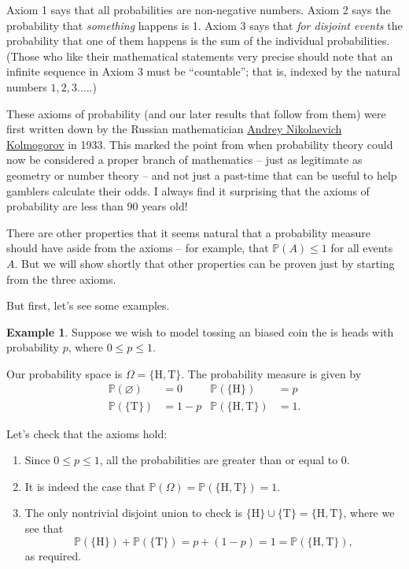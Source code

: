 \documentclass[
  a4paper,
]{book}
\providecommand{\tightlist}{%
  \setlength{\itemsep}{0pt}\setlength{\parskip}{0pt}}
\theoremstyle{definition}
\theoremstyle{definition}
\newtheorem{example}{Example}[chapter]
\theoremstyle{definition}
\theoremstyle{definition}
\theoremstyle{remark}
\begin{document}
Axiom 1 says that all probabilities are non-negative numbers. Axiom 2 says the probability that \emph{something} happens is 1. Axiom 3 says that \emph{for disjoint events} the probability that one of them happens is the sum of the individual probabilities. (Those who like their mathematical statements very precise should note that an infinite sequence in Axiom 3 must be ``countable''; that is, indexed by the natural numbers \(1, 2, 3. \dots\).)

These axioms of probability (and our later results that follow from them) were first written down by the Russian mathematician \href{https://mathshistory.st-andrews.ac.uk/Biographies/Kolmogorov/}{Andrey Nikolaevich Kolmogorov} in 1933. This marked the point from when probability theory could now be considered a proper branch of mathematics -- just as legitimate as geometry or number theory -- and not just a past-time that can be useful to help gamblers calculate their odds. I always find it surprising that the axioms of probability are less than 90 years old!

There are other properties that it seems natural that a probability measure should have aside from the axioms -- for example, that \(\mathbb P(A) \leq 1\) for all events \(A\). But we will show shortly that other properties can be proven just by starting from the three axioms.

But first, let's see some examples.

\begin{example}

Suppose we wish to model tossing an biased coin the is heads with probability \(p\), where \(0 \leq p \leq 1\).

Our probability space is \(\Omega = \{\text{H}, \text{T}\}\). The probability measure is given by
\begin{align*}
   \mathbb P(\varnothing) &= 0  &  \mathbb P(\{\text{H}\}) &= p \\
   \mathbb P(\{\text{T}\}) &= 1 - p  &  \mathbb P(\{\text{H},\text{T}\})  &= 1 .
\end{align*}

Let's check that the axioms hold:

\begin{enumerate}
\def\labelenumi{\arabic{enumi}.}
\tightlist
\item
  Since \(0 \leq p \leq 1\), all the probabilities are greater than or equal to 0.
\item
  It is indeed the case that \(\mathbb P(\Omega) = \mathbb P(\{\text{H},\text{T}\}) = 1\).
\item
  The only nontrivial disjoint union to check is \(\{\text{H}\} \cup \{\text{T}\} = \{\text{H},\text{T}\}\), where we see that
  \[ \mathbb P(\{\text{H}\}) + \mathbb P(\{\text{T}\}) = p + (1 - p) = 1 = \mathbb P(\{\text{H},\text{T}\}) , \]
  as required.
\end{enumerate}

\end{example}
\end{document}
